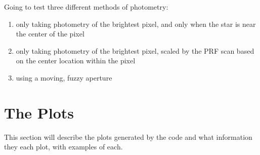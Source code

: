 \documentclass[12pt]{article}
\begin{document}
Going to test three different methods of photometry:
\begin{enumerate}
\item only taking photometry of the brightest pixel, and only when the star is
   near the center of the pixel
\item only taking photometry of the brightest pixel, scaled by the PRF scan based
   on the center location within the pixel
\item using a moving, fuzzy aperture
\end{enumerate}


\section{The Plots}

This section will describe the plots generated by the code and what information
they each plot, with examples of each.
\end{document}
